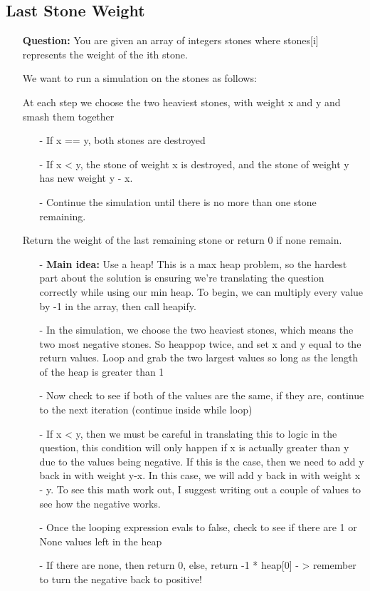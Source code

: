 \documentclass[12pt]{article}
\begin{document}
\subsection{Last Stone Weight}
\begin{enumerate}
  \item[] \textbf{Question:} 
    You are given an array of integers stones where stones[i] represents the weight of the ith stone.

We want to run a simulation on the stones as follows:

At each step we choose the two heaviest stones, with weight x and y and smash them together  
  \begin{enumerate}
    \item[-] If x == y, both stones are destroyed
    \item[-]  If x < y, the stone of weight x is destroyed, and the stone of weight y has new weight y - x.
    \item[-] Continue the simulation until there is no more than one stone remaining. 
\end{enumerate}
Return the weight of the last remaining stone or return 0 if none remain.

    \begin{enumerate}
      \item[-] \textbf{Main idea:} Use a heap! This is a max heap problem, so the hardest part about the solution is ensuring we're translating the question correctly while using our min heap. To begin, we can multiply every value by -1 in the array, then call heapify. 
      \item[-] In the simulation, we choose the two heaviest stones, which means the two most negative stones. So heappop twice, and set x and y equal to the return values. Loop and grab the two largest values so long as the length of the heap is greater than 1
      \item[-] Now check to see if both of the values are the same, if they are, continue to the next iteration (continue inside while loop)
      \item[-] If x < y, then we must be careful in translating this to logic in the question, this condition will only happen if x is actually greater than y due to the values being negative. If this is the case, then we need to add y back in with weight y-x. In this case, we will add y back in with weight x - y. To see this math work out, I suggest writing out a couple of values to see how the negative works.
      \item[-] Once the looping expression evals to false, check to see if there are 1 or None values left in the heap
      \item[-] If there are none, then return 0, else, return -1 * heap[0] - > remember to turn the negative back to positive!
    \end{enumerate}
\end{enumerate}
\end{document}

